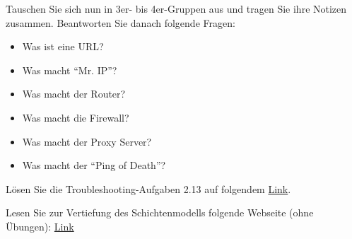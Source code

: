 \begin{myexercise}
	Tauschen Sie sich nun in 3er- bis 4er-Gruppen aus und tragen Sie ihre Notizen zusammen. Beantworten Sie danach folgende Fragen:
	\begin{itemize}
		\item Was ist eine URL?
		\item Was macht \enquote{Mr. IP}?
		\item Was macht der Router?
		\item Was macht die Firewall?
		\item Was macht der Proxy Server?
		\item Was macht der \enquote{Ping of Death}? \faSkull
	\end{itemize}
\end{myexercise}



\begin{mychallenge}
	Lösen Sie die Troubleshooting-Aufgaben 2.13 auf folgendem \href{https://mychallenge.mygymer.ch/base/?book=network}{Link}.
\end{mychallenge}

\begin{mychallenge}
	Lesen Sie zur Vertiefung des Schichtenmodells folgende Webseite (ohne Übungen): \href{https://oinf.ch/kurs/vernetzung-und-systeme/kommunikation-in-netzwerken/}{Link}
\end{mychallenge}
